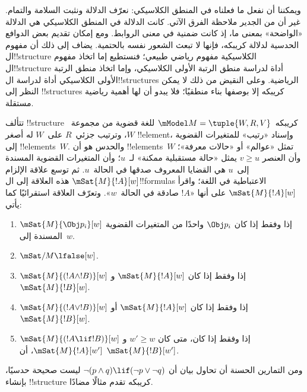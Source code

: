 \documentclass[../../../include/open-logic-section]{subfiles}
\begin{document}
ويمكننا أن نفعل ما فعلناه في المنطق الكلاسيكي: نعرّف الدلالة ونثبت
السلامة والتمام. غير أن من الجدير ملاحظة الفرق الآتي. كانت الدلالة في
المنطق الكلاسيكي هي الدلالة «الواضحة» بمعنى ما، إذ كانت ضمنية في معنى
الروابط. ومع إمكان تقديم بعض الدوافع الحدسية لدلالة كريبكه، فإنها لا
تبعث الشعور نفسه بالحتمية. يضاف إلى ذلك أن مفهوم ال!!{structure}
الكلاسيكية مفهوم رياضي طبيعي؛ فنستطيع إما اتخاذ مفهوم ال!!{structure}
أداة لدراسة منطق الرتبة الأولى الكلاسيكي، وإما اتخاذ منطق الرتبة الأولى
الكلاسيكي أداة لدراسة ال!!{structure}s الرياضية. وعلى النقيض من ذلك لا
يمكن النظر إلى !!{structure}s كريبكه إلا بوصفها بناء منطقيًا؛ فلا يبدو
أن لها أهمية رياضية مستقلة.

تتألف !!{structure} كريبكه~$\mModel M = \tuple{W, R, V}$ للغة قضوية
من مجموعة~$W$، وترتيب جزئي~$R$ على~$W$ له أصغر !!{element}، وإسناد
«رتيب» للمتغيرات القضوية إلى !!{element}s~$W$. والحدس هو أن
!!{element}s~$W$ تمثل «عوالم» أو «حالات معرفة»؛ وأن العنصر $v \geq u$
يمثل «حالة مستقبلية ممكنة» لـ~$u$؛ وأن المتغيرات القضوية المسندة
إلى~$u$ هي القضايا المعروف صدقها في الحالة~$u$. ثم توسع علاقة الإلزام
$\mSat{M}{!A}[w]$ هذه العلاقة إلى ال!!{formula}s الاعتباطية في اللغة؛
واقرأ $\mSat{M}{!A}[w]$ على أنها «$!A$ صادقة في الحالة~$w$». وتعرّف
العلاقة استقرائيًا كما يأتي:
\begin{enumerate}
\item $\mSat{M}{\Obj p_i}[w]$ إذا وفقط إذا كان $\Obj p_i$ واحدًا من
  المتغيرات القضوية المسندة إلى~$w$.
\item $\mSat/{M}{\lfalse}[w]$.
\item $\mSat{M}{(!A \land !B)}[w]$ إذا وفقط إذا كان
  $\mSat{M}{!A}[w]$ و$\mSat{M}{!B}[w]$.
\item $\mSat{M}{(!A \lor !B)}[w]$ إذا وفقط إذا كان
  $\mSat{M}{!A}[w]$ أو $\mSat{M}{!B}[w]$.
\item $\mSat{M}{(!A \lif !B)}[w]$ إذا وفقط إذا كان، متى كان
  $w' \geq w$ و$\mSat{M}{!A}[w']$، أن $\mSat{M}{!B}[w']$.
\end{enumerate}
ومن التمارين الحسنة أن تحاول بيان أن $\lnot (p \land q) \lif
(\lnot p \lor \lnot q)$ ليست صحيحة حدسيًا، بإنشاء !!{structure}
كريبكه تقدم مثالًا مضادًا.
\end{document}
